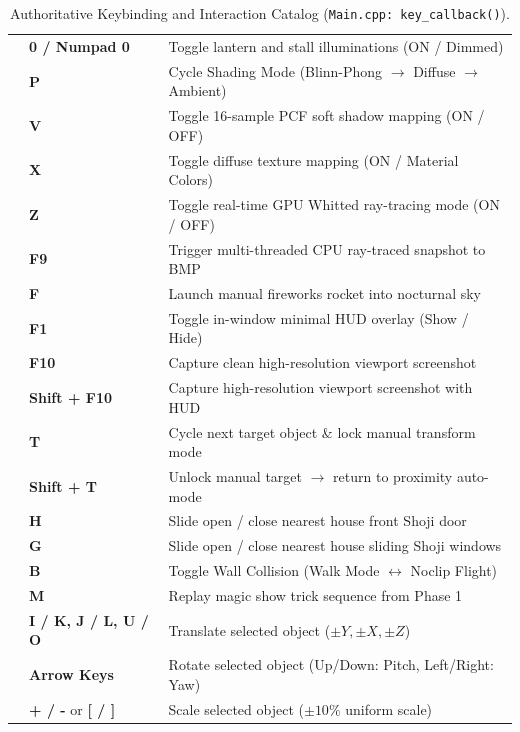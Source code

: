 \begin{table}[htbp]
\begin{tabularx}{\textwidth}{p{3.2cm} p{2.8cm} p{8.4cm}}
& \textbf{0 / Numpad 0} & Toggle lantern and stall illuminations (ON / Dimmed) \\
& \textbf{P} & Cycle Shading Mode (Blinn-Phong $\to$ Diffuse $\to$ Ambient) \\
& \textbf{V} & Toggle 16-sample PCF soft shadow mapping (ON / OFF) \\
& \textbf{X} & Toggle diffuse texture mapping (ON / Material Colors) \\
& \textbf{Z} & Toggle real-time GPU Whitted ray-tracing mode (ON / OFF) \\
& \textbf{F9} & Trigger multi-threaded CPU ray-traced snapshot to BMP \\
& \textbf{F} & Launch manual fireworks rocket into nocturnal sky \\
\addlinespace
\midrule
\multirow{6}{*}{\textbf{Context \& Interaction}} &
\textbf{F1} & Toggle in-window minimal HUD overlay (Show / Hide) \\
& \textbf{F10} & Capture clean high-resolution viewport screenshot \\
& \textbf{Shift + F10} & Capture high-resolution viewport screenshot with HUD \\
& \textbf{T} & Cycle next target object \& lock manual transform mode \\
& \textbf{Shift + T} & Unlock manual target $\to$ return to proximity auto-mode \\
& \textbf{H} & Slide open / close nearest house front Shoji door \\
& \textbf{G} & Slide open / close nearest house sliding Shoji windows \\
& \textbf{B} & Toggle Wall Collision (Walk Mode $\leftrightarrow$ Noclip Flight) \\
& \textbf{M} & Replay magic show trick sequence from Phase 1 \\
\addlinespace
\midrule
\multirow{3}{*}{\textbf{Live Object Transforms}} &
\textbf{I / K, J / L, U / O} & Translate selected object ($\pm Y, \pm X, \pm Z$) \\
& \textbf{Arrow Keys} & Rotate selected object (Up/Down: Pitch, Left/Right: Yaw) \\
& \textbf{+ / -} or \textbf{[ / ]} & Scale selected object ($\pm 10\%$ uniform scale) \\
\bottomrule
\end{tabularx}
\caption{Authoritative Keybinding and Interaction Catalog (\texttt{Main.cpp: key\_callback()}).}
\label{tab:complete_controls}
\end{table}

